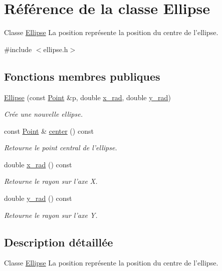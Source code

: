 \hypertarget{classEllipse}{\section{Référence de la classe Ellipse}
\label{classEllipse}
}


Classe \hyperlink{classEllipse}{Ellipse} La position représente la position du centre de l'ellipse.  




{\ttfamily \#include $<$ellipse.\+h$>$}

\subsection*{Fonctions membres publiques}
\begin{DoxyCompactItemize}
\item 
\hyperlink{classEllipse_ad24260e249e5a78b67a779826e8e75d6}{Ellipse} (const \hyperlink{classPoint}{Point} \&p, double \hyperlink{classEllipse_a717ec722ed3528386b610b5ef6d560af}{x\+\_\+rad}, double \hyperlink{classEllipse_affc33b7f55133f772c94c8ae890fb5a0}{y\+\_\+rad})
\begin{DoxyCompactList}\small\item\em Crée une nouvelle ellipse. \end{DoxyCompactList}\item 
const \hyperlink{classPoint}{Point} \& \hyperlink{classEllipse_aab7c65b75ef01d20ec48f1e2b9308ebf}{center} () const 
\begin{DoxyCompactList}\small\item\em Retourne le point central de l'ellipse. \end{DoxyCompactList}\item 
double \hyperlink{classEllipse_a717ec722ed3528386b610b5ef6d560af}{x\+\_\+rad} () const 
\begin{DoxyCompactList}\small\item\em Retourne le rayon sur l'axe X. \end{DoxyCompactList}\item 
double \hyperlink{classEllipse_affc33b7f55133f772c94c8ae890fb5a0}{y\+\_\+rad} () const 
\begin{DoxyCompactList}\small\item\em Retourne le rayon sur l'axe Y. \end{DoxyCompactList}\end{DoxyCompactItemize}


\subsection{Description détaillée}
Classe \hyperlink{classEllipse}{Ellipse} La position représente la position du centre de l'ellipse. 

